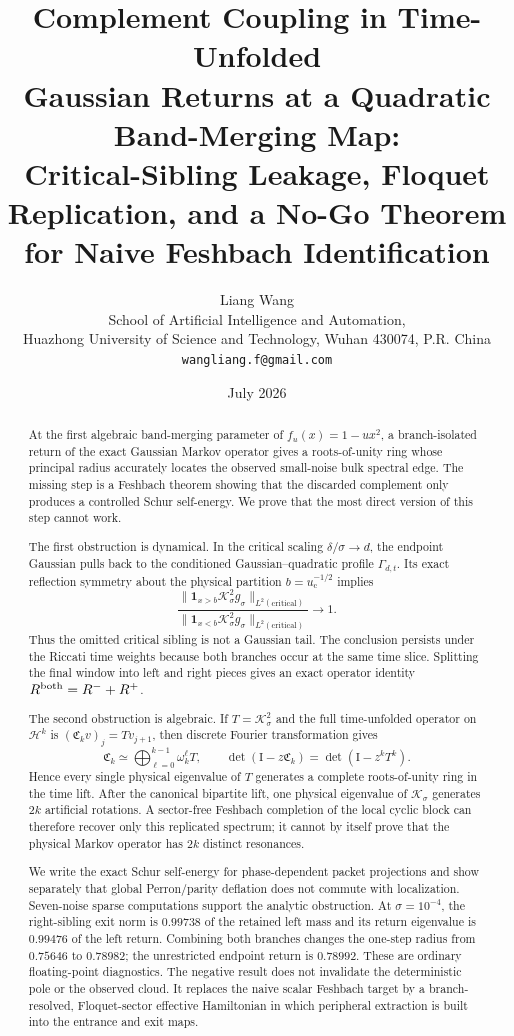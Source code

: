\documentclass[11pt]{article}
\title{\textbf{Complement Coupling in Time-Unfolded}\\
\textbf{Gaussian Returns at a Quadratic Band-Merging Map:}\\[0.35em]
\large Critical-Sibling Leakage, Floquet Replication, and a No-Go Theorem\\
for Naive Feshbach Identification}
\author{Liang Wang\\
\small School of Artificial Intelligence and Automation,\\[-0.2em]
\small Huazhong University of Science and Technology, Wuhan 430074, P.R. China\\
\small \texttt{wangliang.f@gmail.com}}
\date{July 2026}
\theoremstyle{definition}
\theoremstyle{remark}
\newcommand{\Id}{\mathrm I}
\begin{document}
\maketitle

\begin{abstract}
At the first algebraic band-merging parameter of
$f_u(x)=1-u x^2$, a branch-isolated return of the exact Gaussian Markov
operator gives a roots-of-unity ring whose principal radius accurately
locates the observed small-noise bulk spectral edge.  The missing step is a
Feshbach theorem showing that the discarded complement only produces a
controlled Schur self-energy.  We prove that the most direct version of this
step cannot work.

The first obstruction is dynamical.  In the critical scaling
$\delta/\sigma\to d$, the endpoint Gaussian pulls back to the conditioned
Gaussian--quadratic profile $\Gamma_{d,t}$.  Its exact reflection symmetry
about the physical partition $b=u_{\mathrm c}^{-1/2}$ implies
\[
 \frac{\|\mathbf1_{x>b}\mathcal K_\sigma^2g_\sigma\|_{L^2(\mathrm{critical})}}
 {\|\mathbf1_{x<b}\mathcal K_\sigma^2g_\sigma\|_{L^2(\mathrm{critical})}}
 \longrightarrow1.
\]
Thus the omitted critical sibling is not a Gaussian tail.  The conclusion
persists under the Riccati time weights because both branches occur at the
same time slice.  Splitting the final window into left and right pieces gives
an exact operator identity
$R^{\rm both}=R^-+R^+$.

The second obstruction is algebraic.  If $T=\mathcal K_\sigma^2$ and the
full time-unfolded operator on $\mathcal H^k$ is
$(\mathfrak C_kv)_j=Tv_{j+1}$, then discrete Fourier transformation gives
\[
 \mathfrak C_k\simeq\bigoplus_{\ell=0}^{k-1}\omega_k^\ell T,
 \qquad
 \det(\Id-z\mathfrak C_k)=\det(\Id-z^kT^k).
\]
Hence every single physical eigenvalue of $T$ generates a complete
roots-of-unity ring in the time lift.  After the canonical bipartite lift,
one physical eigenvalue of $\mathcal K_\sigma$ generates $2k$ artificial
rotations.  A sector-free Feshbach completion of the local cyclic block can
therefore recover only this replicated spectrum; it cannot by itself prove
that the physical Markov operator has $2k$ distinct resonances.

We write the exact Schur self-energy for phase-dependent packet projections
and show separately that global Perron/parity deflation does not commute with
localization.  Seven-noise sparse computations support the analytic
obstruction.  At $\sigma=10^{-4}$, the right-sibling exit norm is $0.99738$
of the retained left mass and its return eigenvalue is $0.99476$ of the left
return.  Combining both branches changes the one-step radius from
$0.75646$ to $0.78982$; the unrestricted endpoint return is $0.78992$.
These are ordinary floating-point diagnostics.  The negative result does not
invalidate the deterministic pole or the observed cloud.  It replaces the
naive scalar Feshbach target by a branch-resolved, Floquet-sector effective
Hamiltonian in which peripheral extraction is built into the entrance and
exit maps.
\end{abstract}
\end{document}
